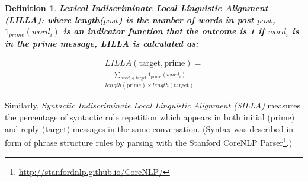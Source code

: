 \documentclass[man,biblatex,floatsintext]{apa6}
\newtheorem{defn}[thm]{Definition}
\begin{document}
\begin{defn} \textbf{Lexical Indiscriminate Local Linguistic Alignment (LILLA): where length($post$) is the number of words in post $post$, $1_{prime}(word_{i})$ is an indicator function that the outcome is 1 if $word_{i}$ is in the prime message, LILLA is calculated as:} \end{defn}

\begin{equation}
\begin{split}
{LILLA}(\text{target},\text{prime})=\\
\frac{\sum_{word_{i}\in \text{target}} 1_{\text{prime}}(word_{i})}{length(\text{prime}) \times length(\text{target})}
\end{split}
\label{eq:LILLA}
\end{equation}


Similarly, \emph{Syntactic Indiscriminate Local Linguistic Alignment (SILLA)} measures the percentage of syntactic rule repetition which appears in both initial (prime) and reply (target) messages in the same conversation. (Syntax was described in form of phrase structure rules by parsing with the Stanford CoreNLP Parser\footnote{\url{http://stanfordnlp.github.io/CoreNLP/}}.)
\end{document}
